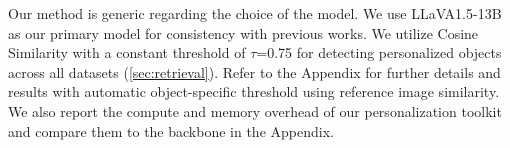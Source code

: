 Our method is generic regarding the choice of the \VLM model. We use LLaVA1.5-13B~\cite{liu2024improved} as our primary \VLM model for consistency with previous works. %
We utilize Cosine Similarity with a constant threshold of $\tau$=0.75 for detecting personalized objects across all datasets (\ref{sec:retrieval}). Refer to the Appendix for further details and results with automatic object-specific threshold using reference image similarity. We also report the compute and memory overhead of our personalization toolkit and compare them to the backbone in the Appendix.

